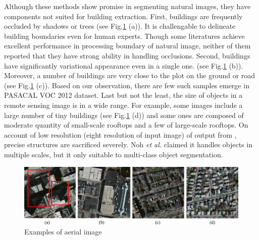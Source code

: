 \documentclass[runningheads]{llncs}
\begin{document}
   Although these methods show promise in segmenting natural images, they have components not suited for building extraction. First, buildings are frequently occluded by shadows or trees (see Fig.\ref{fig:AerialImages} (a)). It is challengable to delineate building boundaries even for human experts. Though some literatures\cite{chen14semantic,Zheng2015Conditional} achieve excellent performance in processing boundary of natural image, neither of them reported that they have strong ability in handling occlusions. Second, buildings have significantly variational appearance even in a single one. (see Fig.\ref{fig:AerialImages} (b)). Moreover, a number of buildings are very close to the plot on the ground or road (see Fig.\ref{fig:AerialImages} (c)). Based on our observation, there are few such samples emerge in PASACAL VOC 2012 dataset. Last but not the least, the size of objects in a remote sensing image is in a wide range. For example, some images include a large number of tiny buildings (see Fig.\ref{fig:AerialImages} (d)) and some ones are composed of moderate quantity of small-scale rooftops and a few of large-scale rooftops. On account of low resolution (eight resolution of input image) of output from \cite{Long2014Fully}, precise structures are sacrificed severely. Noh \textit{et al.} \cite{Noh2015Learning} claimed  it handles objects in multiple scales, but it only suitable to multi-class object segmentation. 


\begin{figure}
\centering
\label{fig:AerialImages}
\includegraphics[width=120mm]{AerialImages}
\caption{Examples of aerial image}
\end{figure}      
            
\end{document}
